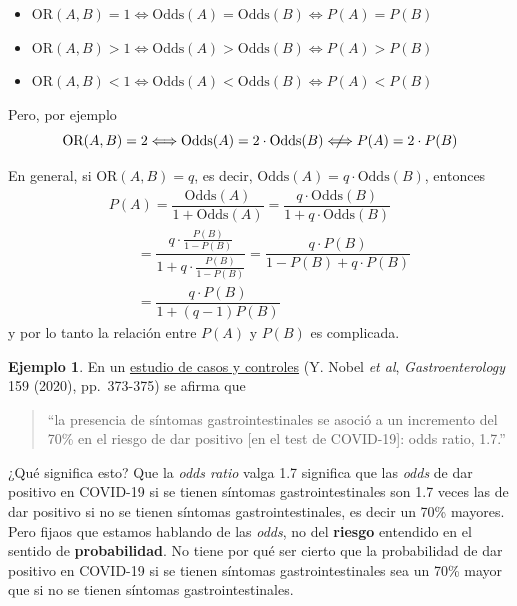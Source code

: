 \documentclass[
]{book}
\theoremstyle{definition}
\theoremstyle{definition}
\newtheorem{example}{Ejemplo}[chapter]
\theoremstyle{definition}
\theoremstyle{definition}
\theoremstyle{remark}
\begin{document}
\begin{itemize}
\item
  \(\text{OR}(A,B)=1\Longleftrightarrow \text{Odds}(A)=\text{Odds}(B) \Longleftrightarrow P(A)=P(B)\)
\item
  \(\text{OR}(A,B)>1\Longleftrightarrow \text{Odds}(A)>\text{Odds}(B) \Longleftrightarrow P(A)>P(B)\)
\item
  \(\text{OR}(A,B)<1\Longleftrightarrow \text{Odds}(A)<\text{Odds}(B) \Longleftrightarrow P(A)<P(B)\)
\end{itemize}

Pero, por ejemplo
\[
\text{OR}(A,B)=2 \Longleftrightarrow \text{Odds}(A)= 2\cdot \text{Odds}(B) \hspace{1.2ex}
\not\hspace{-1.2ex}\Longleftrightarrow P(A)=
2\cdot P(B)
\]

\begin{rmdcorbes}
En general, si \(\text{OR}(A,B)=q\), es decir, \(\text{Odds}(A)=q\cdot\text{Odds}(B)\), entonces
\[
\begin{array}{l}
P(A)=\dfrac{\text{Odds}(A)}{1+\text{Odds}(A)}=\dfrac{q\cdot\text{Odds}(B)}{1+q\cdot\text{Odds}(B)}\\
\qquad =\dfrac{q\cdot\frac{ P(B)}{1-P(B)}}{1+q\cdot\frac{P(B)}{1-P(B)}}=\dfrac{q\cdot  P(B)}{1-P(B)+q\cdot P(B)}\\
\qquad=\dfrac{q\cdot P(B)}{1+(q-1)P(B)}
\end{array}
\]
y por lo tanto la relación entre \(P(A)\) y \(P(B)\) es complicada.
\end{rmdcorbes}

\begin{example}
\protect\hypertarget{exm:unnamed-chunk-110}{}\label{exm:unnamed-chunk-110}En un \href{https://www.gastrojournal.org/article/S0016-5085(20)30490-X/fulltext}{estudio de casos y controles} (Y. Nobel \emph{et al}, \emph{Gastroenterology} 159 (2020), pp.~373-375) se afirma que
\end{example}

\begin{quote}
``la presencia de síntomas gastrointestinales se asoció a un incremento del 70\% en el riesgo de dar positivo {[}en el test de COVID-19{]}: odds ratio, 1.7.''
\end{quote}

¿Qué significa esto? Que la \emph{odds ratio} valga 1.7 significa que las \emph{odds} de dar positivo en COVID-19 si se tienen síntomas gastrointestinales son 1.7 veces las de dar positivo si no se tienen síntomas gastrointestinales, es decir un 70\% mayores. Pero fijaos que estamos hablando de las \emph{odds}, no del \textbf{riesgo} entendido en el sentido de \textbf{probabilidad}. No tiene por qué ser cierto que la probabilidad de dar positivo en COVID-19 si se tienen síntomas gastrointestinales sea un 70\% mayor que si no se tienen síntomas gastrointestinales.
\end{document}
